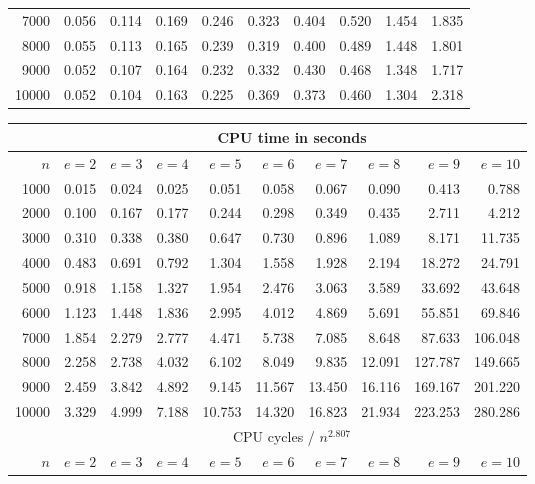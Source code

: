 \documentclass{sig-alternate}
\newcommand{\mycomputer}{2.66~Ghz Intel i7\xspace}
\begin{document}
\begin{table*}
\begin{small}
\begin{tabular}{|r||r|r|r|r|r|r|r|r|r|}
 7000 & 0.056 & 0.114 & 0.169 & 0.246 & 0.323 & 0.404 & 0.520 & 1.454 & 1.835\\
 8000 & 0.055 & 0.113 & 0.165 & 0.239 & 0.319 & 0.400 & 0.489 & 1.448 & 1.801\\
 9000 & 0.052 & 0.107 & 0.164 & 0.232 & 0.332 & 0.430 & 0.468 & 1.348 & 1.717\\
10000 & 0.052 & 0.104 & 0.163 & 0.225 & 0.369 & 0.373 & 0.460 & 1.304 & 2.318\\
\hline
\end{tabular}
\end{small}
\caption{Multiplication on \mycomputer}
\label{tab:moremul}
\end{table*}

\begin{table*}
\centering
\begin{small}
\begin{tabular}{|r||r|r|r|r|r|r|r|r|r|}
\hline
     & \multicolumn{9}{|c|}{CPU time in seconds}\\
\hline
$n$  & $e=2$ & $e=3$ & $e=4$ & $e=5$ & $e=6$ & $e=7$ & $e=8$ & $e=9$ & $e=10$\\
\hline
 1000 & 0.015 & 0.024 & 0.025 &  0.051 &  0.058 &  0.067 &  0.090 &   0.413 &   0.788\\
 2000 & 0.100 & 0.167 & 0.177 &  0.244 &  0.298 &  0.349 &  0.435 &   2.711 &   4.212\\
 3000 & 0.310 & 0.338 & 0.380 &  0.647 &  0.730 &  0.896 &  1.089 &   8.171 &  11.735\\
 4000 & 0.483 & 0.691 & 0.792 &  1.304 &  1.558 &  1.928 &  2.194 &  18.272 &  24.791\\
 5000 & 0.918 & 1.158 & 1.327 &  1.954 &  2.476 &  3.063 &  3.589 &  33.692 &  43.648\\
 6000 & 1.123 & 1.448 & 1.836 &  2.995 &  4.012 &  4.869 &  5.691 &  55.851 &  69.846\\
 7000 & 1.854 & 2.279 & 2.777 &  4.471 &  5.738 &  7.085 &  8.648 &  87.633 & 106.048\\
 8000 & 2.258 & 2.738 & 4.032 &  6.102 &  8.049 &  9.835 & 12.091 & 127.787 & 149.665\\
 9000 & 2.459 & 3.842 & 4.892 &  9.145 & 11.567 & 13.450 & 16.116 & 169.167 & 201.220\\
10000 & 3.329 & 4.999 & 7.188 & 10.753 & 14.320 & 16.823 & 21.934 & 223.253 & 280.286\\
\hline
\hline
     & \multicolumn{9}{|c|}{CPU cycles / $n^{2.807}$}\\
\hline
$n$  & $e=2$ & $e=3$ & $e=4$ & $e=5$ & $e=6$ & $e=7$ & $e=8$ & $e=9$ & $e=10$\\

\end{tabular}
\end{small}
\end{table*}
\end{document}
